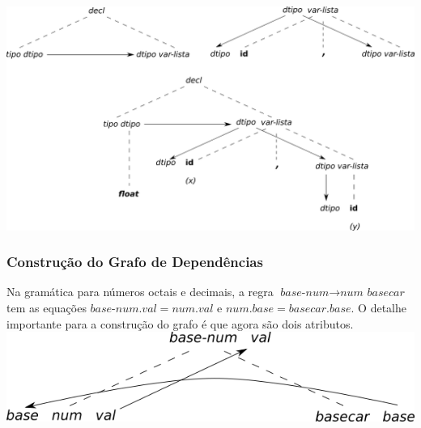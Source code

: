 \documentclass[table]{beamer}
\begin{document}
\begin{frame}
   \includegraphics[width=\linewidth,height=\textheight,keepaspectratio]{figuras/exemplo67completo.png}
\end{frame}

\begin{frame}
   \frametitle{Construção do Grafo de Dependências}
   Na gramática para números octais e decimais, a regra $\textit{base-num}\to\textit{num basecar}$ tem as equações $\textit{base-num}.val = num.val$ e $num.base = basecar.base$. O detalhe importante para a construção do grafo é que agora são dois atributos.
   \includegraphics[width=\linewidth,height=\textheight,keepaspectratio]{figuras/exemplo68.png}
\end{frame}
\end{document}
